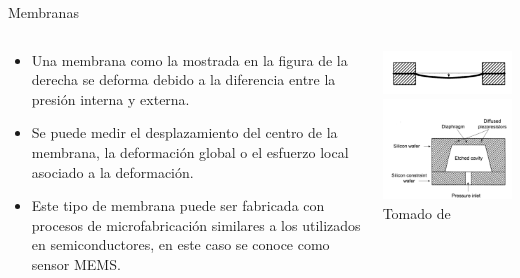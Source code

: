 \documentclass[aspectratio=169]{beamer}
\begin{document}
\begin{frame}{Membranas}
    \begin{columns}[c, onlytextwidth]
        \begin{column}{0.6\textwidth}
            \begin{itemize}
                \item Una membrana como la mostrada en la figura de la derecha se deforma debido a la diferencia entre la presión interna y externa.
                \item Se puede medir el desplazamiento del centro de la membrana, la deformación global o el esfuerzo local asociado a la deformación.
                \item Este tipo de membrana puede ser fabricada con procesos de microfabricación similares a los utilizados en semiconductores, en este caso se conoce como sensor MEMS.
            \end{itemize}
        \end{column}
        \begin{column}{0.4\textwidth}
            \centering
            \includegraphics[width=5cm]{fig/Presion/membrana.PNG}
            \includegraphics[width=5cm]{fig/Presion/memsmembrana.PNG}
             \\ \tiny{Tomado de \cite{pallas2012sensors}}
        \end{column}
    \end{columns}
\end{frame}
\end{document}
